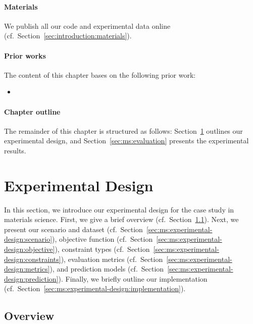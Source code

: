 \paragraph{Materials}

We publish all our code and experimental data online (cf.~Section~\ref{sec:introduction:materials}).

\paragraph{Prior works}

The content of this chapter bases on the following prior work:
%
\begin{itemize}
	\item {}
\end{itemize}

\paragraph{Chapter outline}

The remainder of this chapter is structured as follows:
Section~\ref{sec:ms:experimental-design} outlines our experimental design, and Section~\ref{sec:ms:evaluation} presents the experimental results.

\section{Experimental Design}
\label{sec:ms:experimental-design}

In this section, we introduce our experimental design for the case study in materials science.
First, we give a brief overview (cf.~Section~\ref{sec:ms:experimental-design:overview}).
Next, we present our scenario and dataset (cf.~Section~\ref{sec:ms:experimental-design:scenario}), objective function (cf.~Section~\ref{sec:ms:experimental-design:objective}), constraint types (cf.~Section~\ref{sec:ms:experimental-design:constraints}), evaluation metrics (cf.~Section~\ref{sec:ms:experimental-design:metrics}), and prediction models (cf.~Section~\ref{sec:ms:experimental-design:prediction}).
Finally, we briefly outline our implementation (cf.~Section~\ref{sec:ms:experimental-design:implementation}).

\subsection{Overview}
\label{sec:ms:experimental-design:overview}

